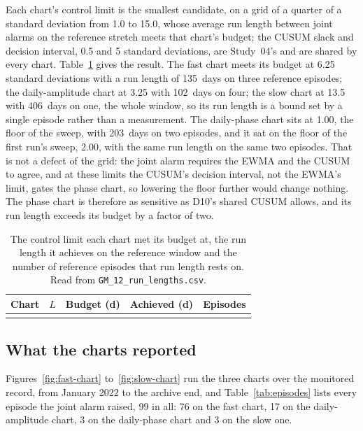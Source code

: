 \documentclass[11pt,a4paper]{article}
\begin{document}
Each chart's control limit is the smallest candidate, on a grid of a quarter
of a standard deviation from 1.0 to 15.0, whose average run length between joint alarms
on the reference stretch meets that chart's budget; the CUSUM slack and
decision interval, 0.5 and 5 standard deviations, are Study~04's and are
shared by every chart. Table~\ref{tab:run-lengths} gives the result. The fast
chart meets its budget at 6.25 standard deviations with a run length of
135~days on three reference episodes; the daily-amplitude chart at 3.25 with
102~days on four; the slow chart at 13.5 with 406~days on one, the whole
window, so its run length is a bound set by a single episode rather than a
measurement. The daily-phase chart sits at 1.00, the floor of the sweep, with
203~days on two episodes, and it sat on the floor of the first run's sweep,
2.00, with the same run length on the same two episodes. That is not a defect
of the grid: the joint alarm requires the EWMA and the CUSUM to agree, and at
these limits the CUSUM's decision interval, not the EWMA's limit, gates the
phase chart, so lowering the floor further would change nothing. The phase
chart is therefore as sensitive as D10's shared CUSUM allows, and its run
length exceeds its budget by a factor of two.

\begin{table}[H]
\centering
\caption{The control limit each chart met its budget at, the run length it
achieves on the reference window and the number of reference episodes that
run length rests on. Read from \texttt{GM\_12\_run\_lengths.csv}.}
\label{tab:run-lengths}
\begin{tabular}{lrrrr}
\toprule
Chart & $L$ & Budget (d) & Achieved (d) & Episodes \\
\midrule
\\
\bottomrule
\end{tabular}
\end{table}

\subsection{What the charts reported}

Figures~\ref{fig:fast-chart} to~\ref{fig:slow-chart} run the three charts over
the monitored record, from January 2022 to the archive end, and
Table~\ref{tab:episodes} lists every episode the joint alarm raised, 99 in
all: 76 on the fast chart, 17 on the daily-amplitude chart, 3 on the
daily-phase chart and 3 on the slow one.
\end{document}
